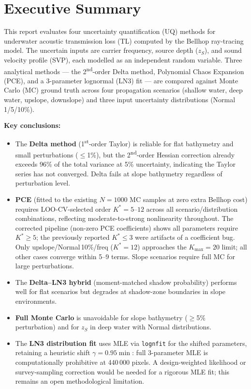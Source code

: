 \documentclass[11pt,a4paper]{article}
\begin{document}

\section*{Executive Summary}


This report evaluates four uncertainty quantification (UQ) methods for
underwater acoustic transmission loss (TL) computed by the Bellhop ray-tracing
model.
The uncertain inputs are carrier frequency, source depth ($z_S$), and sound
velocity profile (SVP), each modelled as an independent random variable.
Three analytical methods --- the 2\textsuperscript{nd}-order Delta method,
Polynomial Chaos Expansion (PCE), and a 3-parameter lognormal (LN3) fit --- are
compared against Monte Carlo (MC) ground truth across four propagation scenarios
(shallow water, deep water, upslope, downslope) and three input
uncertainty distributions (Normal\,1/5/10\%).

\textbf{Key conclusions:}
\begin{itemize}
  \item The \textbf{Delta method} (1\textsuperscript{st}-order Taylor) is
        reliable for flat bathymetry and small perturbations ($\leq$1\%), but the
        2\textsuperscript{nd}-order Hessian correction already exceeds 96\% of the
        total variance at 5\% uncertainty, indicating the Taylor series has not
        converged.  Delta fails at slope bathymetry regardless of perturbation
        level.
  \item \textbf{PCE} (fitted to the existing $N=1000$ MC samples at zero extra
        Bellhop cost) requires LOO-CV-selected order $K^* = 5$--$12$ across all
        scenario/distribution combinations, reflecting moderate-to-strong nonlinearity
        throughout.  The corrected pipeline (non-zero PCE coefficients) shows all
        parameters require $K^*\geq 5$; the previously reported $K^*\leq 3$ were
        artifacts of a coefficient bug.  Only upslope/Normal\,10\%/freq ($K^*=12$)
        approaches the $K_{\max}=20$ limit; all other cases converge within 5--9 terms.
        Slope scenarios require full MC for large perturbations.
  \item The \textbf{Delta--LN3 hybrid} (moment-matched shadow probability)
        performs well for flat scenarios but degrades at shadow-zone boundaries in
        slope environments.
  \item \textbf{Full Monte Carlo} is unavoidable for slope bathymetry ($\geq$5\%
        perturbation) and for $z_S$ in deep water with Normal distributions.
  \item The \textbf{LN3 distribution fit} uses MLE via \texttt{lognfit} for the
        shifted parameters, retaining a heuristic shift $\gamma = 0.95\min$:
        full 3-parameter MLE is computationally prohibitive at 440\,000 pixels.
        A design-weighted likelihood or survey-sampling correction would be needed for a
        rigorous MLE fit; this remains an open methodological limitation.
\end{itemize}
\end{document}
